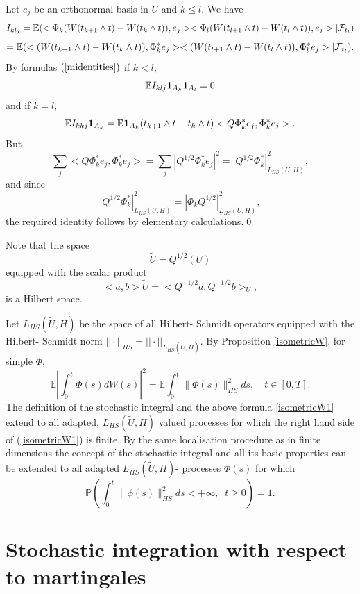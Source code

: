 \documentclass[preprint]{imsart}
\def\P{\mathbb P}
\def\E{\mathbb E}
\begin{document}
{\noindent Let $e_{j}$ be  an orthonormal basis in $U$ and $k\leq l$. We have
$$
I_{klj}= \E (<\Phi_{k}(W(t_{k+ 1}\wedge t)- W(t_{k }\wedge t)), e_j> <\Phi_{l}
(W(t_{l+ 1}\wedge t)- W(t_{l }\wedge t)), e_j >|{\cal F}_{t_{l}})
$$
$$
=\E (< (W(t_{k+ 1}\wedge t)- W(t_{k }\wedge t)), \Phi_{k}^{*} e_j> <
(W(t_{l+ 1}\wedge t)- W(t_{l }\wedge t)), \Phi_{l}^{*}e_j >|{\cal F}_{t_{l}}).
$$
By formulas  $(\ref{midentities})$ if $k < l$,
$$
\E I_{klj}{\bf 1}_{A_k}{\bf 1}_{A_l}= 0
$$
and if $k=l$,
$$
\E I_{kkj}{\bf 1}_{A_k}= \E {\bf 1}_{A_k}(t_{k+ 1}\wedge t - t_{k }\wedge t) <Q \Phi_{k}^{*}e_{j} ,  \Phi_{k}^{*}e_{j}>.
$$
But
$$
\sum_{j} <Q \Phi_{k}^{*}e_{j} ,  \Phi_{k}^{*}e_{j}> = \sum_{j} |Q^{1/2} \Phi_{k}^{*}e_{j}|^2 =
|Q^{1/2} \Phi_{k}^{*}|^{2}_{L_{HS}(U,H)},
$$
and since
$$
|Q^{1/2} \Phi_{k}^{*}|^{2}_{L_{HS}(U, H)}=|\Phi_{k}Q^{1/2}|^{2}_{L_{HS}(U, H)},
$$
the required identity follows by elementary calculations.\qed

\noindent  Note that the space
$$
\widetilde{U} = Q^{1/2}(U)
$$
equipped with the scalar product
$$
< a, b >{\widetilde{U}} = < Q^{-1/2}a, Q^{-1/2}b >_U,
$$
is a Hilbert space.
\vspace{2mm}

\noindent Let $L_{HS}(\widetilde{U},H) $ be the space of all Hilbert- Schmidt operators equipped with
the Hilbert- Schmidt norm $||\cdot||_{HS}=  ||\cdot ||_{L_{HS}(\widetilde{U},H) }$. By Proposition \ref{isometricW}, for simple $\Phi$,
\begin{equation}\label{isometricW1}
    \E \left| \int_0^t \Phi(s)dW(s) \right|^2 =
    \E \int_0^t \|\Phi(s) \|^2_{HS} ds,
    \quad t \in [0,T].
\end{equation}
The definition of the stochastic integral and the above formula \ref {isometricW1} extend to all adapted,
$L_{HS}(\widetilde{U},H)$ valued
processes for which the right hand side of (\ref{isometricW1}) is finite. By the same localisation procedure as in finite
dimensions the concept of the stochastic integral and all its basic properties can be extended to all adapted
$L_{HS}(\widetilde{U},H) $- processes
$\Phi(s)$ for which
$$
    \P \left(
    \int_0^t \| \phi(s) \|_{HS}^{2} ds <  +\infty,\,\,
    \ t \geq 0 \right) = 1.
$$

\section{Stochastic integration with respect to martingales}
}
\end{document}
